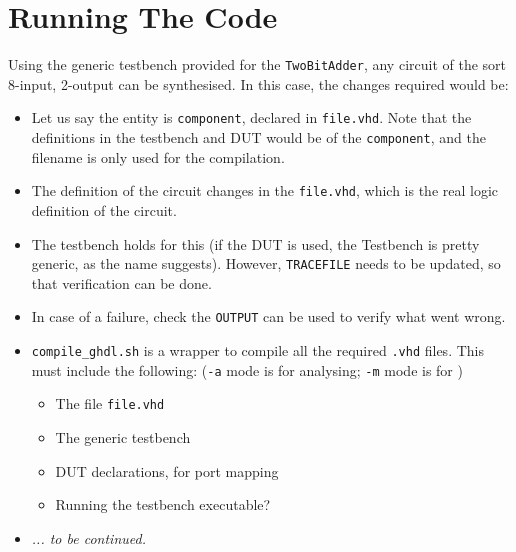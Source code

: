 \documentclass[a4paper]{article}
\begin{document}
\section*{Running The Code}
Using the generic testbench provided for the \texttt{TwoBitAdder}, any circuit of the sort 8-input, 2-output can be synthesised. In this case, the changes required would be:
\begin{itemize}
	\item Let us say the entity is \texttt{component}, declared in \texttt{file.vhd}. Note that the definitions in the testbench and DUT would be of the \texttt{component}, and the filename is only used for the compilation.
	\item The definition of the circuit changes in the \texttt{file.vhd}, which is the real logic definition of the circuit.
	\item The testbench holds for this (if the DUT is used, the Testbench is pretty generic, as the name suggests). However, \texttt{TRACEFILE} needs to be updated, so that verification can be done.
	\item In case of a failure, check the \texttt{OUTPUT} can be used to verify what went wrong.
	\item \texttt{compile\_ghdl.sh} is a wrapper to compile all the required \texttt{.vhd} files. This must include the following: (\texttt{-a} mode is for analysing; \texttt{-m} mode is for )
	\begin{itemize}
		\item The file \texttt{file.vhd}
		\item The generic testbench
		\item DUT declarations, for port mapping
		\item Running the testbench executable?
	\end{itemize}
	\item {\em ... to be continued.}
\end{itemize}
\end{document}
